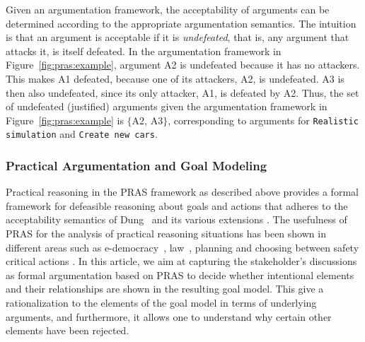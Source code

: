 
Given an argumentation framework, the acceptability of arguments can be determined according to the appropriate argumentation semantics. The intuition is that an argument is acceptable if it is \emph{undefeated}, that is, any argument that attacks it, is itself defeated. In the argumentation framework in Figure~\ref{fig:pras:example}, argument A2 is undefeated because it has no attackers. This makes A1 defeated, because one of its attackers, A2, is undefeated. A3 is then also undefeated, since its only attacker, A1, is defeated by A2. Thus, the set of undefeated (justified) arguments given the argumentation framework in Figure~\ref{fig:pras:example} is $\{$A2, A3$\}$, corresponding to arguments for \texttt{Realistic simulation} and \texttt{Create new cars}.

\subsubsection*{Practical Argumentation and Goal Modeling}
\label{sect:background:pras:motivation}

Practical reasoning in the PRAS framework as described above provides a formal framework for defeasible reasoning about goals and actions that adheres to the acceptability semantics of Dung~\cite{Dung1995} and its various extensions \cite{amgoud2002reasoning,modgil2009}. The usefulness of PRAS for the analysis of practical reasoning situations has been shown in different areas such as e-democracy~\cite{cartwright2009IS}, law~\cite{atkinson2005legal}, planning \cite{medellin2013planning} and choosing between safety critical actions \cite{tolchinsky2012deliberation}. In this article, we aim at capturing the stakeholder's discussions as formal argumentation based on PRAS to decide whether intentional elements and their relationships are shown in the resulting goal model. This give a rationalization to the elements of the goal model in terms of underlying arguments, and furthermore, it allows one to understand why certain other elements have been rejected.

